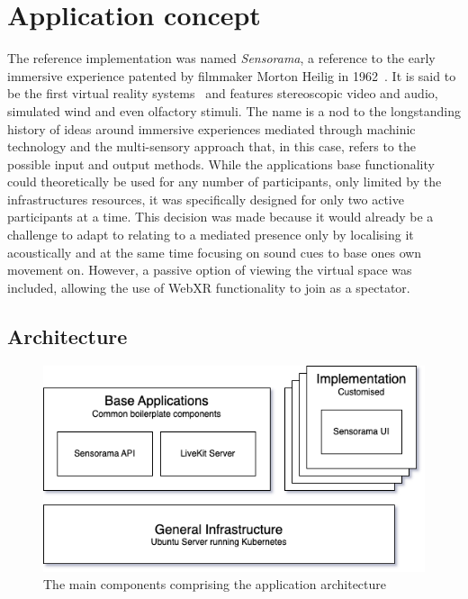 \chapter{Application concept}
\label{ch:concept}

The reference implementation was named \emph{Sensorama}, a reference to the early immersive experience patented by filmmaker Morton Heilig in 1962~\parencite{Heilig_1962}.
It is said to be the first virtual reality systems~\parencite[5][]{vrHistoryGigante} and features stereoscopic video and audio, simulated wind and even olfactory stimuli.
The name is a nod to the longstanding history of ideas around immersive experiences mediated through machinic technology and the multi-sensory approach that, in this case, refers to the possible input and output methods.
While the application\textquotesingle s base functionality could theoretically be used for any number of participants, only limited by the infrastructure\textquotesingle s resources, it was specifically designed for only two active participants at a time.
This decision was made because it would already be a challenge to adapt to relating to a mediated presence only by localising it acoustically and at the same time focusing on sound cues to base one\textquotesingle s own movement on.
However, a passive option of viewing the virtual space was included, allowing the use of \ac{WebXR} functionality to join as a spectator.

\section{Architecture}
\label{sec:architecture}

\begin{figure}[h]
\centering
\includegraphics[scale=0.5]{04_Artefakte/01_Abbildungen/sensorama-stack}
\caption[Sensorama stack diagram]{The main components comprising the application architecture\protect}
\label{fig:sensoramaStack}
\end{figure}

